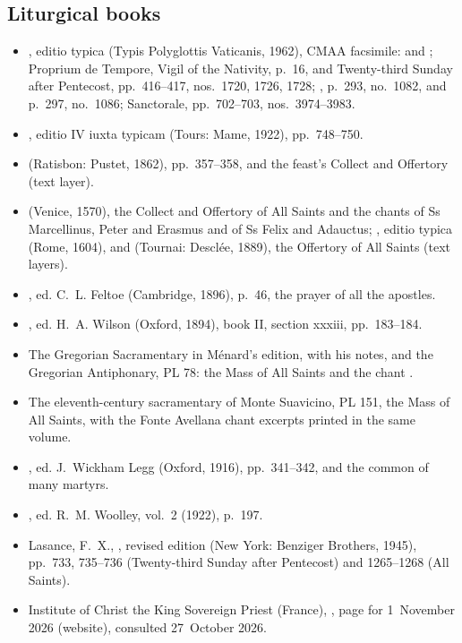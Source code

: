 {\small
\subsection*{Liturgical books}
\begin{itemize}[leftmargin=1.2em,itemsep=.25em]
\item {}, editio typica (Typis
Polyglottis Vaticanis, 1962), CMAA facsimile:  and
; Proprium de Tempore, Vigil of the
Nativity, p.~16, and Twenty-third Sunday after Pentecost, pp.~416--417,
nos.~1720, 1726, 1728; , p.~293, no.~1082, and p.~297,
no.~1086; Sanctorale, pp.~702--703, nos.~3974--3983.
\item {}, editio IV iuxta typicam (Tours: Mame, 1922),
pp.~748--750.
\item {} (Ratisbon: Pustet, 1862), pp.~357--358, and the
feast's Collect and Offertory (text layer).
\item {} (Venice, 1570), the Collect and Offertory of All
Saints and the chants of Ss Marcellinus, Peter and Erasmus and of Ss Felix and
Adauctus; , editio typica (Rome, 1604), and
 (Tournai: Desclée, 1889), the Offertory of All Saints
(text layers).
\item {}, ed. C.~L. Feltoe (Cambridge, 1896),
p.~46, the prayer of all the apostles.
\item {}, ed. H.~A. Wilson (Oxford, 1894),
book II, section xxxiii, pp.~183--184.
\item The Gregorian Sacramentary in Ménard's edition, with his notes, and the
Gregorian Antiphonary, PL 78: the Mass of All Saints and the
chant .
\item The eleventh-century sacramentary of Monte Suavicino, PL 151, the Mass of All Saints, with the Fonte Avellana chant excerpts printed
in the same volume.
\item {}, ed. J.~Wickham Legg
(Oxford, 1916), pp.~341--342, and the common of many martyrs.
\item {}, ed. R.~M. Woolley, vol.~2 (1922),
p.~197.
\item Lasance, F.~X., ,
revised edition (New York: Benziger Brothers, 1945), pp.~733, 735--736
(Twenty-third Sunday after Pentecost) and 1265--1268 (All Saints).
\item Institute of Christ the King Sovereign Priest (France), ,
page for 1~November 2026 (website), consulted 27~October 2026.
\end{itemize}

}
